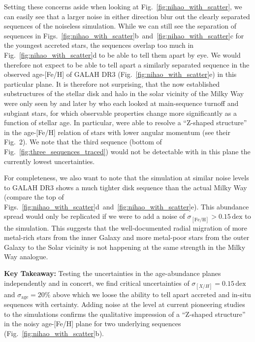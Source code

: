 \documentclass[fleqn,usenatbib]{mnras}
\begin{document}
Setting these concerns aside when looking at Fig.~\ref{fig:nihao_with_scatter}, we can easily see that a larger noise in either direction blur out the clearly separated sequences of the noiseless simulation. While we can still see the separation of sequences in Figs.~\ref{fig:nihao_with_scatter}b~and~\ref{fig:nihao_with_scatter}c for the youngest accreted stars, the sequences overlap too much in Fig.~\ref{fig:nihao_with_scatter}d to be able to tell them apart by eye. We would therefore not expect to be able to tell apart a similarly separated sequence in the observed age-[Fe/H] of GALAH DR3 (Fig.~\ref{fig:nihao_with_scatter}e) in this particular plane. It is therefore not surprising, that the now established substructures of the stellar disk and halo in the solar vicinity of the Milky Way were only seen by \citet[][see their Fig.~4]{Sahlholdt2022} and later by \citet{Xiang2022} who each looked at main-sequence turnoff and subgiant stars, for which observable properties change more significantly as a function of stellar age. In particular, \citet{Xiang2022} were able to resolve a ``Z-shaped structure'' in the age-[Fe/H] relation of stars with lower angular momentum (see their Fig.~2). We note that the third sequence (bottom of Fig.~\ref{fig:three_sequences_traced}) would not be detectable with in this plane the currently lowest uncertainties.

For completeness, we also want to note that the simulation at similar noise levels to GALAH DR3 shows a much tighter disk sequence than the actual Milky Way (compare the top of Figs.~\ref{fig:nihao_with_scatter}d~and~\ref{fig:nihao_with_scatter}e). This abundance spread would only be replicated if we were to add a noise of $\sigma_\mathrm{[Fe/H]}> 0.15\,\mathrm{dex}$ to the simulation. This suggests that the well-documented radial migration \citep[e.g.][]{Haywood2008b, Frankel2018} of more metal-rich stars from the inner Galaxy and more metal-poor stars from the outer Galaxy to the Solar vicinity is not happening at the same strength in the Milky Way analogue.

\textbf{Key Takeaway:} Testing the uncertainties in the age-abundance planes independently and in concert, we find critical uncertainties of $\sigma_{[X/H]} = 0.15\,\mathrm{dex}$ and $\sigma_\mathrm{age} = 20\%$ above which we loose the ability to tell apart accreted and in-situ sequences with certainty. Adding noise at the level at current pioneering studies to the simulations confirms the qualitative impression of a ``Z-shaped structure'' \citep{Xiang2022} in the noisy age-[Fe/H] plane for two underlying sequences (Fig.~\ref{fig:nihao_with_scatter}b).
\end{document}
